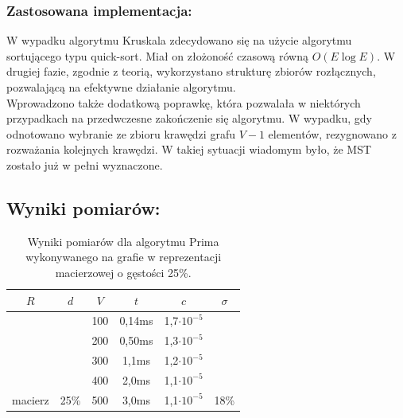 \documentclass[a4paper,12pt]{article}
\begin{document}
\subsubsection{Zastosowana implementacja:}
W wypadku algorytmu Kruskala zdecydowano się na użycie algorytmu sortującego typu quick-sort. Miał on złożoność czasową równą $O(E \log E)$. W drugiej fazie, zgodnie z teorią, wykorzystano strukturę zbiorów rozłącznych, pozwalającą na efektywne działanie algorytmu.\\

\noindent
Wprowadzono także dodatkową poprawkę, która pozwalała w niektórych przypadkach na przedwczesne zakończenie się algorytmu. W wypadku, gdy odnotowano wybranie ze zbioru krawędzi grafu $V-1$ elementów, rezygnowano z rozważania kolejnych krawędzi. W takiej sytuacji wiadomym było, że MST zostało już w pełni wyznaczone.

\subsection{Wyniki pomiarów:}

\begin{table}[H]
	\centering
	\caption{\centering Wyniki pomiarów dla algorytmu Prima wykonywanego na grafie w reprezentacji macierzowej o gęstości 25\%.}
	\begin{tabular}{|c|c|c|c|c|c|}
		\hline
		\rowcolor[HTML]{C0C0C0} 
		$R$                       & $d$                    & $V$ & $t$    & $c$                & $\sigma$               \\ \hline
		&                        & 100 & 0,14ms & 1,7$\cdot 10^{-5}$ &                        \\ \cline{3-5}
		&                        & 200 & 0,50ms & 1,3$\cdot 10^{-5}$ &                        \\ \cline{3-5}
		&                        & 300 & 1,1ms  & 1,2$\cdot 10^{-5}$ &                        \\ \cline{3-5}
		&                        & 400 & 2,0ms  & 1,1$\cdot 10^{-5}$ &                        \\ \cline{3-5}
		\multirow{-5}{*}{macierz} & \multirow{-5}{*}{25\%} & 500 & 3,0ms  & 1,1$\cdot 10^{-5}$ & \multirow{-5}{*}{18\%} \\ \hline
	\end{tabular}
\end{table}
\end{document}
